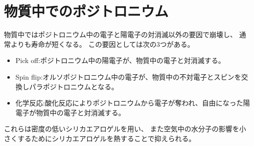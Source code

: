 \section{物質中でのポジトロニウム}

物質中ではポジトロニウム中の電子と陽電子の対消滅以外の要因で崩壊し、
通常よりも寿命が短くなる。
この要因としては次の3つがある。
\begin{itemize}
\item Pick off:ポジトロニウム中の陽電子が、物質中の電子と対消滅する。
\item Spin flip:オルソポジトロニウム中の電子が、物質中の不対電子とスピンを交換しパラポジトロニウムとなる。
\item 化学反応:酸化反応によりポジトロニウムから電子が奪われ、自由になった陽電子が物質中の電子と対消滅する。
\end{itemize}
これらは密度の低いシリカエアロゲルを用い、
また空気中の水分子の影響を小さくするためにシリカエアロゲルを熱することで抑えられる。

%
